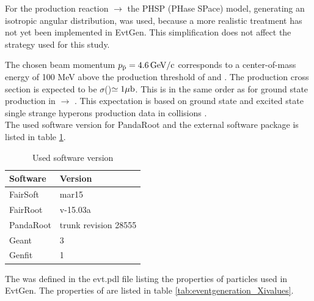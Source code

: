 For the production reaction \pbarp $\rightarrow$ \excitedcascade\anticascade the PHSP (PHase SPace) model, 
generating an isotropic angular distribution, was used,
because a more realistic treatment has not yet been implemented in EvtGen. 
This simplification does not affect the strategy used for this study.

The chosen beam momentum $p_{\bar{\textnormal{p}}} = 4.6\, \textnormal{GeV/c}$ corresponds to a center-of-mass energy 
of 100 MeV above the production threshold of \excitedcascade and \anticascade.
The production cross section is expected to be $\sigma$(\mychannel)$\simeq 1 \mu\textnormal{b}$. This is in the same order as for ground 
state \cascade production in \pbarp $\rightarrow$ \cascade\anticascade \cite{PANDAphysics2009}.
This expectation is based on ground state and excited state single strange hyperons production data in \pbarp collisions \cite{CERN}.
\\

The used software version for PandaRoot and the external software package is listed in table \ref{tab:eventgeneration_software}.

\begin{table}[tb]
	\centering
	\caption{Used software version}
	\label{tab:eventgeneration_software}
	\begin{tabular}{ll}
		\hline
		Software & Version \\
		\hline
		\hline
		FairSoft & mar15\\
		FairRoot & v-15.03a \\
		PandaRoot & trunk revision 28555 \\
		Geant & 3\\
		Genfit & 1\\\hline
			 
	\end{tabular}
\end{table}


The \excitedcascade was defined in the evt.pdl file listing the properties of particles used in EvtGen. 
The properties of \excitedcascade are listed in table \ref{tab:eventgeneration_Xivalues}.


